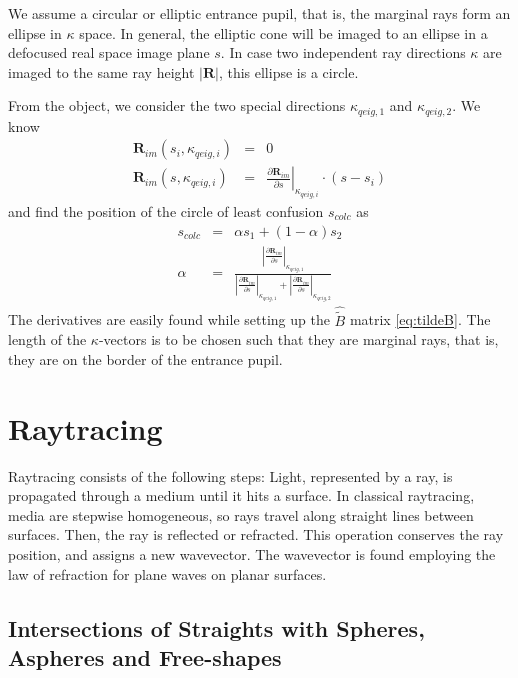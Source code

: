 \documentclass[12pt,a4paper,twoside,openright,BCOR10mm,headsepline,titlepage,abstracton,chapterprefix,final]{scrreprt}
\newcommand\Vector[1]{{\mathbf{#1}}}
\begin{document}
We assume a circular or elliptic entrance pupil, that is, the marginal rays form an ellipse in $\kappa$ space.
In general, the elliptic cone will be imaged to an ellipse in a defocused real space image plane $s$.
In case two independent ray directions $\kappa$ are imaged to the same ray height $|\Vector{R}|$, this ellipse is a circle.

From the object, we consider the two special directions $\kappa_{qeig, 1}$ and $\kappa_{qeig, 2}$.
We know
\begin{eqnarray}
 \Vector{R}_{im}(s_{i}, \kappa_{qeig, i}) &=& 0 \\
 \Vector{R}_{im}(s, \kappa_{qeig, i}) &=& \left. \frac{\partial \Vector{R}_{im}}{\partial s} \right|_{\kappa_{qeig, i}} \cdot ( s-s_i ) 
\end{eqnarray}
and find the position of the circle of least confusion $s_{colc}$ as
\begin{eqnarray}
 s_{colc} &=& \alpha s_1 + (1-\alpha) s_2 \\[2ex]
 \alpha &=& \frac{
                  \left| \frac{\partial \Vector{R}_{im}}{\partial s} \right|_{\kappa_{qeig, 1}}
                 }
                 {
                  \left| \frac{\partial \Vector{R}_{im}}{\partial s} \right|_{\kappa_{qeig, 1}}
                  +
                  \left| \frac{\partial \Vector{R}_{im}}{\partial s} \right|_{\kappa_{qeig, 2}}
                 }
\end{eqnarray}
The derivatives are easily found while setting up the $\hat{\tilde{B}}$ matrix \eqref{eq:tildeB}.
The length of the $\kappa$-vectors is to be chosen such that they are marginal rays, that is, they are on the border of the entrance pupil.



\chapter{Raytracing}

Raytracing consists of the following steps:
Light, represented by a ray, is propagated through a medium until it hits a surface.
In classical raytracing, media are stepwise homogeneous, so rays travel along straight lines between surfaces.
Then, the ray is reflected or refracted. 
This operation conserves the ray position, and assigns a new wavevector.
The wavevector is found employing the law of refraction for plane waves on planar surfaces.


\section{Intersections of Straights with Spheres, Aspheres and Free-shapes}\label{subsec:intersectionformulas}
\end{document}
